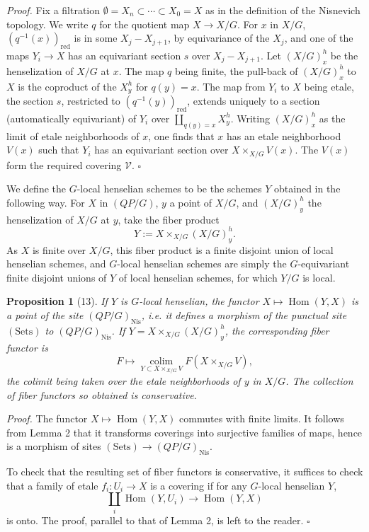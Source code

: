 \documentclass[11pt]{article}
\newcommand{\Nis}{\mathrm{Nis}}
\newcommand{\Hom}{\operatorname{Hom}}
\newcommand{\red}{\mathrm{red}}
\theoremstyle{deligne}
\newtheorem*{proposition*}{Proposition}
\newenvironment{proofdel}{\noindent\textit{Proof.}}{\hfill$\square$}
\begin{document}
\begin{proofdel}
Fix a filtration \(\emptyset=X_n\subset\cdots\subset X_0=X\) as in the definition of the Nisnevich topology. We write \(q\) for the quotient map \(X\to X/G\). For \(x\) in \(X/G\), \((q^{-1}(x))_{\red}\) is in some \(X_j-X_{j+1}\), by equivariance of the \(X_j\), and one of the maps \(Y_i\to X\) has an equivariant section \(s\) over \(X_j-X_{j+1}\). Let \((X/G)^h_x\) be the henselization of \(X/G\) at \(x\). The map \(q\) being finite, the pull-back of \((X/G)^h_x\) to \(X\) is the coproduct of the \(X^h_y\) for \(q(y)=x\). The map from \(Y_i\) to \(X\) being etale, the section \(s\), restricted to \((q^{-1}(y))_{\red}\), extends uniquely to a section (automatically equivariant) of \(Y_i\) over \(\coprod_{q(y)=x}X^h_y\). Writing \((X/G)^h_x\) as the limit of etale neighborhoods of \(x\), one finds that \(x\) has an etale neighborhood \(V(x)\) such that \(Y_i\) has an equivariant section over \(X\times_{X/G}V(x)\). The \(V(x)\) form the required covering \(\mathcal V\).
\end{proofdel}

We define the \(G\)-local henselian schemes to be the schemes \(Y\) obtained in the following way. For \(X\) in \((QP/G)\), \(y\) a point of \(X/G\), and \((X/G)^h_y\) the henselization of \(X/G\) at \(y\), take the fiber product
\[
Y:=X\times_{X/G}(X/G)^h_y.
\]
As \(X\) is finite over \(X/G\), this fiber product is a finite disjoint union of local henselian schemes, and \(G\)-local henselian schemes are simply the \(G\)-equivariant finite disjoint unions of \(Y\) of local henselian schemes, for which \(Y/G\) is local.

\begin{proposition*}[13]
If \(Y\) is \(G\)-local henselian, the functor \(X\mapsto\Hom(Y,X)\) is a point of the site \((QP/G)_{\Nis}\), i.e. it defines a morphism of the punctual site \((\mathrm{Sets})\) to \((QP/G)_{\Nis}\). If \(Y=X\times_{X/G}(X/G)^h_y\), the corresponding fiber functor is
\[
F\longmapsto \operatorname*{colim}_{Y\subset X\times_{X/G}V}F(X\times_{X/G}V),
\]
the colimit being taken over the etale neighborhoods of \(y\) in \(X/G\). The collection of fiber functors so obtained is conservative.
\end{proposition*}

\begin{proofdel}
The functor \(X\mapsto\Hom(Y,X)\) commutes with finite limits. It follows from Lemma 2 that it transforms coverings into surjective families of maps, hence is a morphism of sites \((\mathrm{Sets})\to(QP/G)_{\Nis}\).

To check that the resulting set of fiber functors is conservative, it suffices to check that a family of etale \(f_i:U_i\to X\) is a covering if for any \(G\)-local henselian \(Y\),
\[
\coprod_i \Hom(Y,U_i)\longrightarrow \Hom(Y,X)
\]
is onto. The proof, parallel to that of Lemma 2, is left to the reader.
\end{proofdel}
\end{document}

